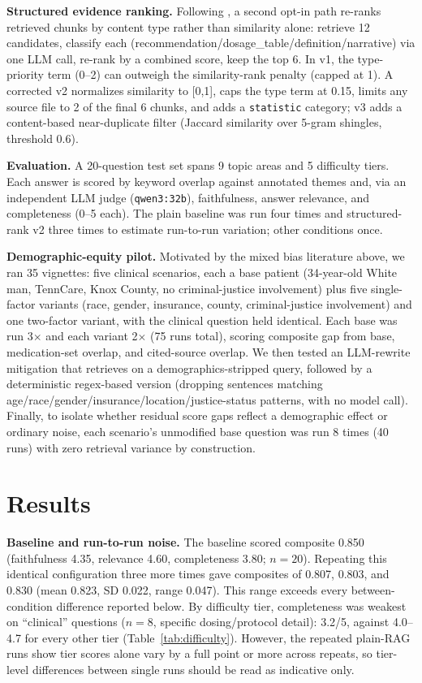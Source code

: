\documentclass[letterpaper]{article}
\begin{document}
\textbf{Structured evidence ranking.} Following \citet{clinicbot2026}, a second opt-in path re-ranks retrieved chunks by content type rather than similarity alone: retrieve 12 candidates, classify each (recommendation/dosage\_table/definition/narrative) via one LLM call, re-rank by a combined score, keep the top 6. In v1, the type-priority term (0--2) can outweigh the similarity-rank penalty (capped at 1). A corrected v2 normalizes similarity to [0,1], caps the type term at 0.15, limits any source file to 2 of the final 6 chunks, and adds a \texttt{statistic} category; v3 adds a content-based near-duplicate filter (Jaccard similarity over 5-gram shingles, threshold 0.6).

\textbf{Evaluation.} A 20-question test set spans 9 topic areas and 5 difficulty tiers. Each answer is scored by keyword overlap against annotated themes and, via an independent LLM judge (\texttt{qwen3:32b}), faithfulness, answer relevance, and completeness (0--5 each). The plain baseline was run four times and structured-rank v2 three times to estimate run-to-run variation; other conditions once.

\textbf{Demographic-equity pilot.} Motivated by the mixed bias literature above, we ran 35 vignettes: five clinical scenarios, each a base patient (34-year-old White man, TennCare, Knox County, no criminal-justice involvement) plus five single-factor variants (race, gender, insurance, county, criminal-justice involvement) and one two-factor variant, with the clinical question held identical. Each base was run 3$\times$ and each variant 2$\times$ (75 runs total), scoring composite gap from base, medication-set overlap, and cited-source overlap. We then tested an LLM-rewrite mitigation that retrieves on a demographics-stripped query, followed by a deterministic regex-based version (dropping sentences matching age/race/gender/insurance/location/justice-status patterns, with no model call). Finally, to isolate whether residual score gaps reflect a demographic effect or ordinary noise, each scenario's unmodified base question was run 8 times (40 runs) with zero retrieval variance by construction.

\section{Results}

\textbf{Baseline and run-to-run noise.} The baseline scored composite 0.850 (faithfulness 4.35, relevance 4.60, completeness 3.80; $n=20$). Repeating this identical configuration three more times gave composites of 0.807, 0.803, and 0.830 (mean 0.823, SD 0.022, range 0.047). This range exceeds every between-condition difference reported below. By difficulty tier, completeness was weakest on ``clinical'' questions ($n=8$, specific dosing/protocol detail): 3.2/5, against 4.0--4.7 for every other tier (Table~\ref{tab:difficulty}). However, the repeated plain-RAG runs show tier scores alone vary by a full point or more across repeats, so tier-level differences between single runs should be read as indicative only.
\end{document}
